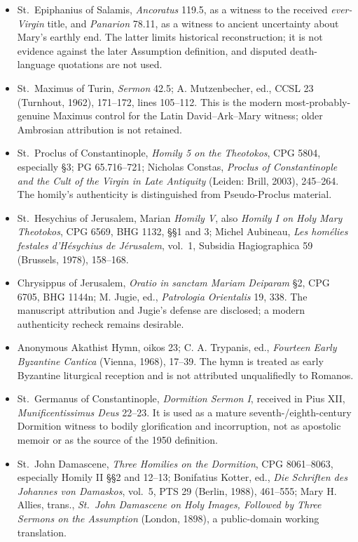 \begin{itemize}
  \item St.~Epiphanius of Salamis, \emph{Ancoratus} 119.5, as a witness to the received \emph{ever-Virgin} title, and \emph{Panarion} 78.11, as a witness to ancient uncertainty about Mary's earthly end.  The latter limits historical reconstruction; it is not evidence against the later Assumption definition, and disputed death-language quotations are not used.
  \item St.~Maximus of Turin, \emph{Sermon} 42.5; A. Mutzenbecher, ed., CCSL 23 (Turnhout, 1962), 171--172, lines 105--112.  This is the modern most-probably-genuine Maximus control for the Latin David--Ark--Mary witness; older Ambrosian attribution is not retained.
  \item St.~Proclus of Constantinople, \emph{Homily 5 on the Theotokos}, CPG 5804, especially §3; PG 65.716--721; Nicholas Constas, \emph{Proclus of Constantinople and the Cult of the Virgin in Late Antiquity} (Leiden: Brill, 2003), 245--264.  The homily's authenticity is distinguished from Pseudo-Proclus material.
  \item St.~Hesychius of Jerusalem, Marian \emph{Homily V}, also \emph{Homily I on Holy Mary Theotokos}, CPG 6569, BHG 1132, §§1 and 3; Michel Aubineau, \emph{Les homélies festales d'Hésychius de Jérusalem}, vol.~1, Subsidia Hagiographica 59 (Brussels, 1978), 158--168.
  \item Chrysippus of Jerusalem, \emph{Oratio in sanctam Mariam Deiparam} §2, CPG 6705, BHG 1144n; M. Jugie, ed., \emph{Patrologia Orientalis} 19, 338.  The manuscript attribution and Jugie's defense are disclosed; a modern authenticity recheck remains desirable.
  \item Anonymous Akathist Hymn, oikos 23; C. A. Trypanis, ed., \emph{Fourteen Early Byzantine Cantica} (Vienna, 1968), 17--39.  The hymn is treated as early Byzantine liturgical reception and is not attributed unqualifiedly to Romanos.
  \item St.~Germanus of Constantinople, \emph{Dormition Sermon I}, received in Pius XII, \emph{Munificentissimus Deus} 22--23.  It is used as a mature seventh-/eighth-century Dormition witness to bodily glorification and incorruption, not as apostolic memoir or as the source of the 1950 definition.
  \item St.~John Damascene, \emph{Three Homilies on the Dormition}, CPG 8061--8063, especially Homily II §§2 and 12--13; Bonifatius Kotter, ed., \emph{Die Schriften des Johannes von Damaskos}, vol.~5, PTS 29 (Berlin, 1988), 461--555; Mary H. Allies, trans., \emph{St.~John Damascene on Holy Images, Followed by Three Sermons on the Assumption} (London, 1898), a public-domain working translation.

\end{itemize}
